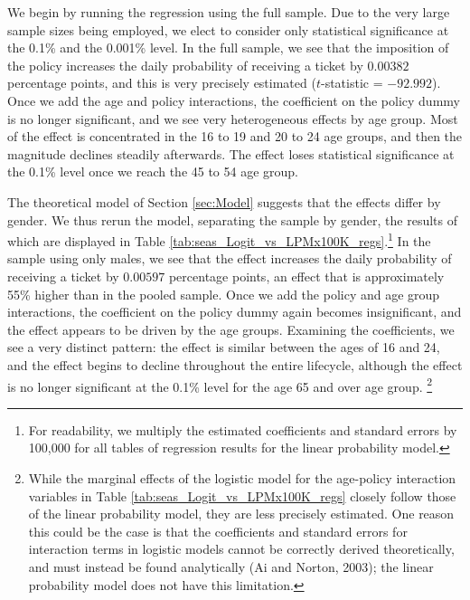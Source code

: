 

% 
% 

We begin by running the regression using the full sample.
Due to the very large sample sizes being employed, 
we elect to consider only statistical significance at the 0.1\% and the 0.001\% level. 
% 
In the full sample, we see that the imposition of the policy increases the daily probability 
of receiving a ticket by $0.00382$ percentage points, 
and this is very precisely estimated ($t$-statistic = $-92.992$). 
Once we add the age and policy interactions, 
the coefficient on the policy dummy is no longer significant, 
and we see very heterogeneous effects by age group. 
Most of the effect is concentrated in the 16 to 19 and 20 to 24 age groups, 
and then the magnitude declines steadily afterwards. 
The effect loses statistical significance at the 0.1\% level once we reach the 45 to 54 age group.

The theoretical model of Section \ref{sec:Model} 
suggests that the effects differ by gender. 
We thus rerun the model, separating the sample by gender, 
the results of which are displayed in 
Table \ref{tab:seas_Logit_vs_LPMx100K_regs}.\footnote{%
For readability, we multiply the estimated coefficients and standard errors by 100,000 
for all tables of regression results for the linear probability model.
}
% 
In the sample using only males, 
we see that the effect increases the daily probability of receiving a ticket by $0.00597$ 
percentage points, an effect that is approximately 55\% higher than in the pooled sample. 
Once we add the policy and age group interactions, 
the coefficient on the policy dummy again becomes insignificant, 
and the effect appears to be driven by the age groups. 
Examining the coefficients, we see a very distinct pattern: 
the effect is similar between the ages of 16 and 24, 
and the effect begins to decline throughout the entire lifecycle, 
although the effect is no longer significant at the 0.1\% level for the age 65 and over age group.%
\footnote{%
While the marginal effects of the logistic model for the age-policy interaction variables in 
Table \ref{tab:seas_Logit_vs_LPMx100K_regs}
closely follow those of the linear probability model, they are less precisely estimated. 
One reason this could be the case is that the coefficients and standard errors 
for interaction terms in logistic models cannot be correctly derived theoretically, 
and must instead be found analytically (Ai and Norton, 2003); 
the linear probability model does not have this limitation.
}
%

